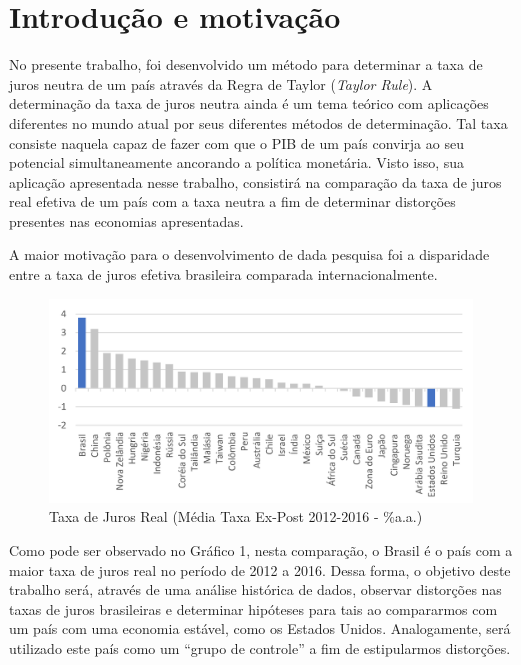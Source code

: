 \section*{Introdu\c{c}\~{a}o e motiva\c{c}\~{a}o }

 No presente trabalho, foi desenvolvido um m\'{e}todo para determinar a taxa de juros neutra de um pa\'{i}s atrav\'{e}s da Regra de Taylor (\textit{Taylor Rule}). A determina\c{c}\~{a}o da taxa de juros neutra ainda \'{e} um tema te\'{o}rico com aplica\c{c}\~{o}es diferentes no mundo atual por seus diferentes m\'{e}todos de determina\c{c}\~{a}o. Tal taxa consiste naquela capaz de fazer com que o PIB de um pa\'{i}s convirja ao seu potencial simultaneamente ancorando a pol\'{i}tica monet\'{a}ria. Visto isso, sua aplica\c{c}\~{a}o apresentada nesse trabalho, consistir\'{a} na compara\c{c}\~{a}o da taxa de juros real efetiva de um pa\'{i}s com a taxa neutra a fim de determinar distor\c{c}\~{o}es presentes nas economias apresentadas.

A maior motiva\c{c}\~{a}o para o desenvolvimento de dada pesquisa foi a disparidade entre a taxa de juros efetiva brasileira comparada internacionalmente.

\begin{figure}
    \centering
    \caption{Taxa de Juros Real (Média Taxa Ex-Post 2012-2016 - \%a.a.)}
    \includegraphics[width = \linewidth]{relatorios/macro/imagens/grafico1}
\end{figure}

 Como pode ser observado no Gr\'{a}fico 1, nesta compara\c{c}\~{a}o, o Brasil \'{e} o pa\'{i}s com a maior taxa de juros real no per\'{i}odo de 2012 a 2016. Dessa forma, o objetivo deste trabalho ser\'{a}, atrav\'{e}s de uma an\'{a}lise hist\'{o}rica de dados, observar distor\c{c}\~{o}es nas taxas de juros brasileiras e determinar hip\'{o}teses para tais ao compararmos com um pa\'{i}s com uma economia est\'{a}vel, como os Estados Unidos. Analogamente, ser\'{a} utilizado este pa\'{i}s como um ``grupo de controle'' a fim de estipularmos distor\c{c}\~{o}es. 

